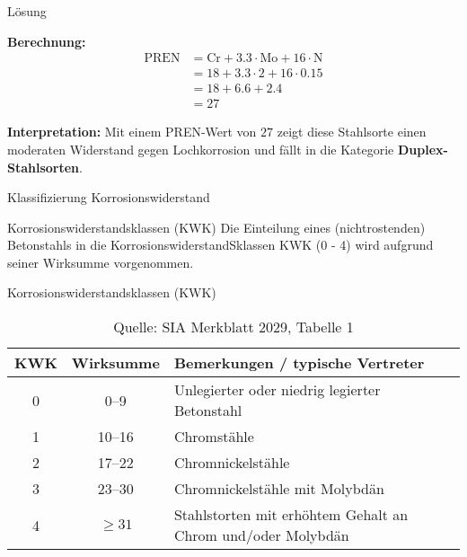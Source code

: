 \begin{frame}{Lösung}
  \begin{myLösung}
        \textbf{Berechnung:}
        \begin{align*}
            \text{PREN} &= \text{Cr} + 3.3 \cdot \text{Mo} + 16 \cdot \text{N} \\
            &= 18 + 3.3 \cdot 2 + 16 \cdot 0.15 \\
            &= 18 + 6.6 + 2.4 \\
            &= 27
        \end{align*}

        \pause
        \textbf{Interpretation:} Mit einem PREN-Wert von \( 27 \) zeigt diese Stahlsorte einen moderaten Widerstand gegen Lochkorrosion und fällt in die Kategorie \textbf{Duplex-Stahlsorten}.
    \end{myLösung}
\end{frame}

        


\begin{frame}{Klassifizierung Korrosionswiderstand}
    \begin{Definition_BS}{Korrosionswiderstandsklassen (KWK)}
        Die Einteilung eines (nichtrostenden) Betonstahls in die KorrosionswiderstandSklassen KWK (0 - 4) wird aufgrund seiner Wirksumme vorgenommen.
    \end{Definition_BS}
\end{frame}

\begin{frame}{Korrosionswiderstandsklassen (KWK)}
    \begin{table}[ht]
        \centering
        \renewcommand{\arraystretch}{1.5} %
        \begin{tabular}{|c|c|p{10cm}|}
            \hline
            \rowcolor{blue!20} \textbf{KWK} & \textbf{Wirksumme} & \textbf{Bemerkungen / typische Vertreter} \\
            \hline
            0 & 0--9 & Unlegierter oder niedrig legierter Betonstahl \\
            \hline
            1 & 10--16 & Chromstähle \\
            \hline
            2 & 17--22 & Chromnickelstähle \\
            \hline
            3 & 23--30 & Chromnickelstähle mit Molybdän \\
            \hline
            4 & $\geq 31$ & Stahlstorten mit erhöhtem Gehalt an Chrom und/oder Molybdän \\
            \hline
        \end{tabular}
        \caption{Quelle: SIA Merkblatt 2029, Tabelle 1}
        \label{tab:kwk}
    \end{table}
\end{frame}


